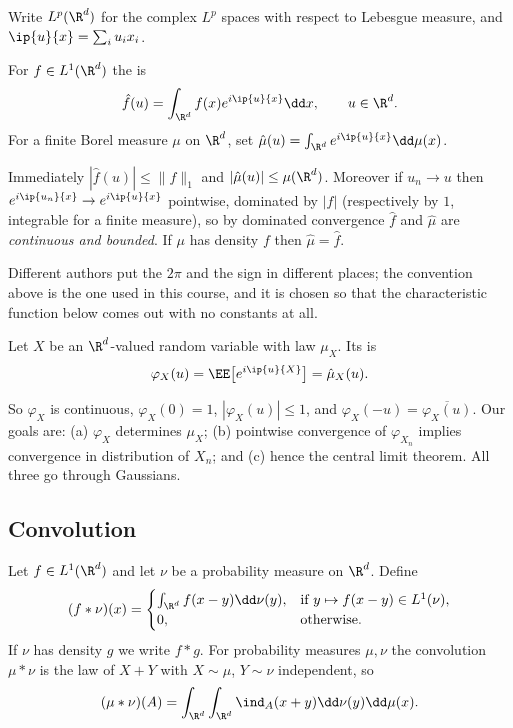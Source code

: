 Write $L^p(\R^d)$ for the complex $L^p$ spaces with respect to Lebesgue measure, and $\ip{u}{x}=\sum_i u_ix_i$.

\begin{definition}
	For $f \in L^1(\R^d)$ the  is
	$$
	\hat f(u) = \int_{\R^d} f(x)e^{i\ip{u}{x}}\dd x, \qquad u \in \R^d.
	$$
	For a finite Borel measure $\mu$ on $\R^d$, set $\hat\mu(u)=\int_{\R^d}e^{i\ip{u}{x}}\dd\mu(x)$.
\end{definition}

\begin{remark}
	Immediately $|\hat f(u)| \leq \|f\|_1$ and $|\hat\mu(u)|\leq\mu(\R^d)$. Moreover if $u_n \to u$ then $e^{i\ip{u_n}{x}}\to e^{i\ip{u}{x}}$ pointwise, dominated by $|f|$ (respectively by $1$, integrable for a finite measure), so by dominated convergence $\hat f$ and $\hat\mu$ are \emph{continuous and bounded}. If $\mu$ has density $f$ then $\hat\mu = \hat f$.

	Different authors put the $2\pi$ and the sign in different places; the convention above is the one used in this course, and it is chosen so that the characteristic function below comes out with no constants at all.
\end{remark}

\begin{definition}
	Let $X$ be an $\R^d$-valued random variable with law $\mu_X$. Its  is
	$$
	\varphi_X(u) = \EE\big[e^{i\ip{u}{X}}\big] = \hat\mu_X(u).
	$$
\end{definition}

So $\varphi_X$ is continuous, $\varphi_X(0)=1$, $|\varphi_X(u)|\leq1$, and $\varphi_X(-u)=\overline{\varphi_X(u)}$. Our goals are: (a) $\varphi_X$ determines $\mu_X$; (b) pointwise convergence of $\varphi_{X_n}$ implies convergence in distribution of $X_n$; and (c) hence the central limit theorem. All three go through Gaussians.

\subsection{Convolution}

\begin{definition}[Convolution]
	Let $f \in L^1(\R^d)$ and let $\nu$ be a probability measure on $\R^d$. Define
	$$
	(f*\nu)(x) = \begin{cases}\int_{\R^d}f(x-y)\dd\nu(y), & \text{if } y\mapsto f(x-y) \in L^1(\nu),\\ 0,&\text{otherwise.}\end{cases}
	$$
	If $\nu$ has density $g$ we write $f * g$. For probability measures $\mu,\nu$ the convolution $\mu*\nu$ is the law of $X+Y$ with $X\sim\mu$, $Y\sim\nu$ independent, so
	$$
	(\mu*\nu)(A) = \int_{\R^d}\int_{\R^d}\ind_A(x+y)\dd\nu(y)\dd\mu(x).
	$$
\end{definition}

